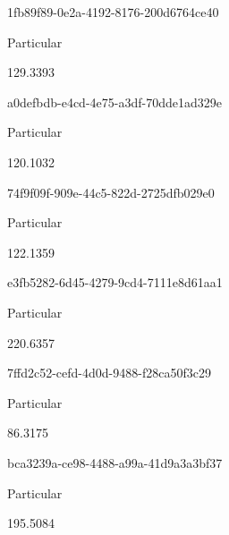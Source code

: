 \documentclass[
  11pt,
  a4paper,
  DIV=11,
  numbers=noendperiod]{scrartcl}
\begin{document}
\n      

1fb89f89-0e2a-4192-8176-200d6764ce40

\n      

Particular

\n      

129.3393

\n    

\n    

\n      

a0defbdb-e4cd-4e75-a3df-70dde1ad329e

\n      

Particular

\n      

120.1032

\n    

\n    

\n      

74f9f09f-909e-44c5-822d-2725dfb029e0

\n      

Particular

\n      

122.1359

\n    

\n    

\n      

e3fb5282-6d45-4279-9cd4-7111e8d61aa1

\n      

Particular

\n      

220.6357

\n    

\n    

\n      

7ffd2c52-cefd-4d0d-9488-f28ca50f3c29

\n      

Particular

\n      

86.3175

\n    

\n    

\n      

bca3239a-ce98-4488-a99a-41d9a3a3bf37

\n      

Particular

\n      

195.5084

\n    

\n    

\n      
\end{document}
